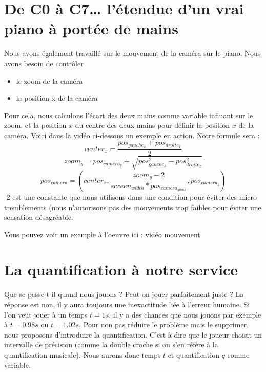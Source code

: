 \documentclass{article}
\begin{document}
\section{De C0 à C7… l’étendue d’un vrai piano à portée de mains}

Nous avons également travaillé sur le mouvement de la caméra sur le piano. Nous avons besoin de contrôler
\begin{itemize}
    \item le zoom de la caméra
    \item la position x de la caméra
\end{itemize}

Pour cela, nous calculons l'écart des deux mains comme variable influant sur le zoom, et la position $x$ du centre des deux mains pour définir la position $x$ de la caméra. Voici dans la vidéo ci-dessous un exemple en action. Notre formule sera :
\begin{equation}
    center_x = \frac{pos_{gauche_x}+pos_{droite_x}}{2}
\end{equation}
\begin{equation}
        zoom_y = pos_{camera_y} + \sqrt{pos_{gauche_x}^2 - pos_{droite_x}^2}
\end{equation}
\begin{equation}
    pos_{camera} = (center_x, \frac{zoom_y-2}{screen_{width}*pos_{camera_{ymax}}}, pos_{camera_z}) 
\end{equation}
-2 est une constante que nous utilisons dans une condition pour éviter des micro tremblements (nous n'autorisons pas des mouvements trop faibles pour éviter une sensation désagréable.  

Vous pouvez voir un exemple à l'oeuvre ici : \href{https://www.youtube.com/watch?v=EnPYldUcp3Q&list=PLvsOC5PoBqO5ggNxiqPKSkO_ZL5-JctbU}{vidéo mouvement}

\section{La quantification à notre service}

Que se passe-t-il quand nous jouons ? Peut-on jouer parfaitement juste ? La réponse est non, il y aura toujours une inexactitude liée à l'erreur humaine. Si l'on veut jouer à un temps $t = 1s$, il y a des chances que nous jouons par exemple à $t = 0.98s$ ou $t = 1.02s$.
\newline
\newline
Pour non pas réduire le problème mais le supprimer, nous proposons d'introduire la quantification. C'est à dire que le joueur choisit un intervalle de précision (comme la double croche si on s'en réfère à la quantification musicale). Nous aurons donc temps $t$ et quantification $q$ comme variable.
\end{document}
